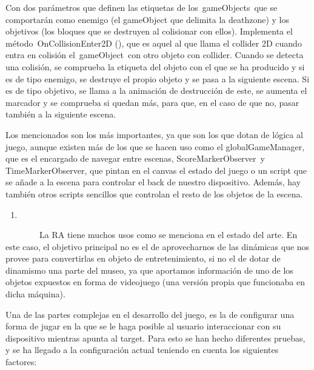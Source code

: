 Con dos parámetros que definen las etiquetas de los~gameObjects~que se
comportarán como enemigo (el gameObject que delimita la deathzone) y los
objetivos (los bloques que se destruyen al colisionar con ellos).
Implementa el método~OnCollisionEnter2D (), que es aquel al que llama el
collider 2D cuando entra en colisión el~gameObject~con otro objeto con
collider. Cuando se detecta una colisión, se comprueba la etiqueta del
objeto con el que se ha producido y si es de tipo enemigo, se destruye
el propio objeto y se pasa a la siguiente escena. Si es de tipo
objetivo, se llama a la animación de destrucción de este, se aumenta el
marcador y se comprueba si quedan más, para que, en el caso de que no,
pasar también a la siguiente escena.

Los mencionados son los más importantes, ya que son los que dotan de
lógica al juego, aunque existen más de los que se hacen uso como el
globalGameManager, que es el encargado de navegar entre escenas,
ScoreMarkerObserver~y TimeMarkerObserver, que pintan en el canvas el
estado del juego o un script que se añade a la escena para controlar el
back de nuestro dispositivo. Además, hay también otros scripts sencillos
que controlan el resto de los objetos de la escena.

\begin{enumerate}
\def\labelenumi{\arabic{enumi}.}
\setcounter{enumi}{3}
\item
\end{enumerate}

~~~~~~~~La RA tiene muchos usos como se menciona en el estado del arte.
En este caso, el objetivo principal no es el de aprovecharnos de las
dinámicas que nos provee para convertirlas en objeto de entretenimiento,
si no el de dotar de dinamismo una parte del museo, ya que aportamos
información de uno de los objetos expuestos en forma de videojuego (una
versión propia que funcionaba en dicha máquina).

Una de las partes complejas en el desarrollo del juego, es la de
configurar una forma de jugar en la que se le haga posible al usuario
interaccionar con su dispositivo mientras apunta al target. Para esto se
han hecho diferentes pruebas, y se ha llegado a la configuración actual
teniendo en cuenta los siguientes factores:

